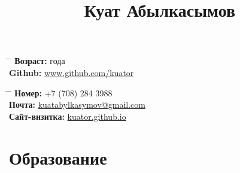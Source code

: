 \documentclass[10pt]{article} %
\begin{document}

\title{Куат Абылкасымов} %


\parbox{0.5\textwidth}{ %
\begin{tabbing} %
\hspace{3cm} \= \hspace{4cm} \= \kill %
{\bf Возраст: }  года \\ %
{\bf Github:} \> \href{https://www.github.com/kuator}{www.github.com/kuator} \\ %
\end{tabbing}}
\hfill %
\parbox{0.5\textwidth}{ %
\begin{tabbing} %
\hspace{3cm} \= \hspace{4cm} \= \kill %
{\bf Номер: } \> +7 (708) 284 3988 \\ %
{\bf Почта: } \> \href{mailto:kuatabylkasymov@gmail.com}{kuatabylkasymov@gmail.com} \\ %
{\bf Сайт-визитка: } \> \href{https://kuator.github.io}{kuator.github.io} \\ %
\end{tabbing}}


\section{Образование}

\end{document}
